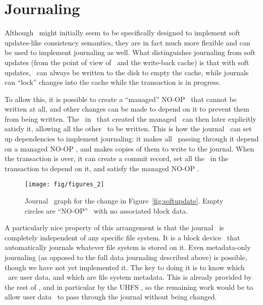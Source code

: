 \section{Journaling}
\label{sec:journal}

Although \chdescs\ might initially seem to be specifically designed to
implement soft updates-like consistency semantics, they are in fact much more
flexible and can be used to implement journaling as well. What distinguishes
journaling from soft updates (from the point of view of \chdescs\ and
the write-back cache) is that with soft updates, \chdescs\ can always
be written to the disk to empty the cache, while journals can ``lock'' changes
into the cache while the transaction is in progress.

To allow this, it is possible to create a ``managed'' NO-OP \chdesc\ that
cannot be written at all, and other changes can be made to depend on it to
prevent them from being written. The \module\ in \Kudos\ that created the
managed \chdesc\ can then later explicitly satisfy it, allowing all the other
\chdescs\ to be written. This is how the journal \module\ can set up
dependencies to implement journaling: it makes all \chdescs\ passing through it
depend on a managed NO-OP \chdesc, and makes copies of them to write to the
journal. When the transaction is over, it can create a commit record, set all
the \chdescs\ in the transaction to depend on it, and satisfy the managed NO-OP
\chdesc.

\begin{figure}
  \centering
  \texttt{[image: fig/figures\_2]}
  \caption{\label{fig:journal} Journal \chdesc\ graph for the
    change in Figure~\ref{fig:softupdate}. Empty circles are
    ``NO-OP'' \chdescs\ with no associated block data.}
\end{figure}

A particularly nice property of this arrangement is that the journal \module\
is completely independent of any specific file system. It is a block device
\module\ that automatically journals whatever file system is stored on it. Even
metadata-only journaling (as opposed to the full data journaling described
above) is possible, though we have not yet implemented it. The key to doing it
is to know which \chdescs\ are user data, and which are file system metadata.
This is already provided by the rest of \Kudos, and in particular by the UHFS
\module, so the remaining work would be to allow user data \chdescs\ to pass
through the journal without being changed.
